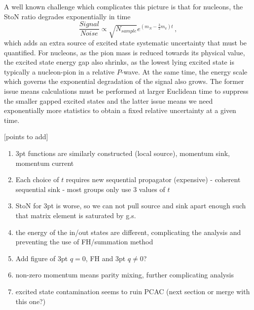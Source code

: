 A well known challenge which complicates this picture is that for nucleons, the StoN ratio degrades exponentially in time~\cite{Lepage:1989hd}
\begin{equation}
\frac{Signal}{Noise} \propto \sqrt{N_{sample}} e^{(m_N - \frac{3}{2}m_\pi)t}\, ,
\end{equation}
 which adds an extra source of excited state systematic uncertainty that must be quantified.
For nucleons, as the pion mass is reduced towards its physical value, the excited state energy gap also shrinks, as the lowest lying excited state is typically a nucleon-pion in a relative $P$-wave.  At the same time, the energy scale which governs the exponential degradation of the signal also grows.  The former issue means calculations must be performed at larger Euclidean time to suppress the smaller gapped excited states and the latter issue means we need exponentially more statistics to obtain a fixed relative uncertainty at a given time.

\bigskip\noindent
{\color{red}[points to add]}
\begin{enumerate}
\item 3pt functions are similarly constructed (local source), momentum sink, momentum current

\item Each choice of $t$ requires new sequential propagator (expensive) - coherent sequential sink - most groups only use 3 values of $t$

\item StoN for 3pt is worse, so we can not pull source and sink apart enough such that matrix element is saturated by g.s.

\item the energy of the in/out states are different, complicating the analysis and preventing the use of FH/summation method

\item Add figure of 3pt $q=0$, FH and 3pt $q\neq0$?

\item non-zero momentum means parity mixing, further complicating analysis

\item excited state contamination seems to ruin PCAC (next section or merge with this one?)


\end{enumerate}
